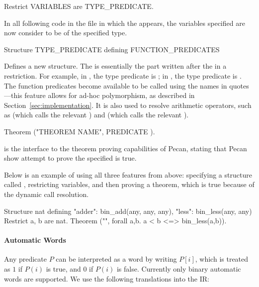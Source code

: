 \begin{pecan}
Restrict VARIABLES are TYPE_PREDICATE.
\end{pecan}

In all following code in the file in which the  appears, the variables specified are now consider to be of the specified type.

\vspace{-0.5em}
\begin{pecan}
Structure TYPE_PREDICATE defining { FUNCTION_PREDICATES }
\end{pecan}
\vspace{-0.5em}

Defines a new structure.
The  is essentially the part written after the  in a restriction. 
For example, in , the type predicate is ; in , the type predicate is .
The function predicates become available to be called using the names in quotes---this feature allows for ad-hoc polymorphism, as described in Section~\ref{sec:implementation}.
It is also used to resolve arithmetic operators, such as \pecaninline{+} (which calls the relevant ) and \pecaninline{<} (which calls the relevant ).

\vspace{-0.5em}
\begin{pecan}
Theorem ("THEOREM NAME", { PREDICATE }).
\end{pecan}
\vspace{-0.5em}
 is the interface to the theorem proving capabilities of Pecan, stating that Pecan show attempt to prove the specified  is true.

Below is an example of using all three features from above: specifying a structure called , restricting variables, and then proving a theorem, which is true because of the dynamic call resolution.
\vspace{-0.5em}
\begin{pecan}
Structure nat defining {
    "adder": bin_add(any, any, any),
    "less": bin_less(any, any)
}
Restrict a, b are nat.
Theorem ("", { forall a,b. a < b <=> bin_less(a,b)}).
\end{pecan}
\vspace{-0.5em}

\paragraph{Automatic Words}
Any predicate $P$ can be interpreted as a word by writing $P[i]$, which is treated as $1$ if $P(i)$ is true, and $0$ if $P(i)$ is false.
Currently only binary automatic words are supported.
We use the following translations into the IR:

